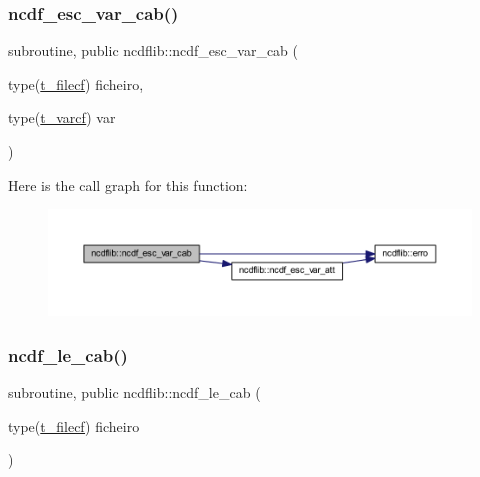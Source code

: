 \subsubsection{\texorpdfstring{ncdf\+\_\+esc\+\_\+var\+\_\+cab()}{ncdf\_esc\_var\_cab()}}
{\footnotesize\ttfamily subroutine, public ncdflib\+::ncdf\+\_\+esc\+\_\+var\+\_\+cab (\begin{DoxyParamCaption}\item[{type(\mbox{\hyperlink{structncdflib_1_1t__filecf}{t\+\_\+filecf}})}]{ficheiro,  }\item[{type(\mbox{\hyperlink{structncdflib_1_1t__varcf}{t\+\_\+varcf}})}]{var }\end{DoxyParamCaption})}

Here is the call graph for this function\+:\nopagebreak
\begin{figure}[H]
\begin{center}
\leavevmode
\includegraphics[width=350pt]{namespacencdflib_a5a3613be95873626820a361a60fb2876_cgraph}
\end{center}
\end{figure}
\mbox{\label{namespacencdflib_a92c4f01a8b6a24a838eab2dc25d7d062}} 
\subsubsection{\texorpdfstring{ncdf\+\_\+le\+\_\+cab()}{ncdf\_le\_cab()}}
{\footnotesize\ttfamily subroutine, public ncdflib\+::ncdf\+\_\+le\+\_\+cab (\begin{DoxyParamCaption}\item[{type(\mbox{\hyperlink{structncdflib_1_1t__filecf}{t\+\_\+filecf}})}]{ficheiro }\end{DoxyParamCaption})}

